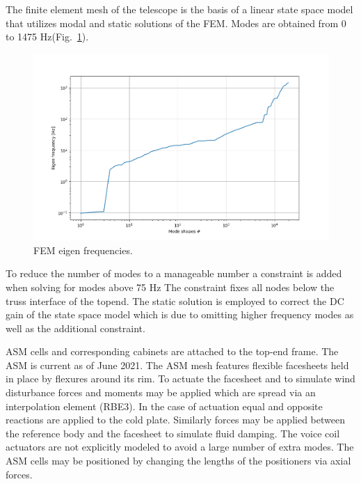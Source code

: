 

The finite element mesh of the telescope is the basis of a linear state space
model that utilizes modal and static solutions of the FEM\cite{20220824_1218_MT_mount_zen_30_m1HFN_ASM_D}. Modes are obtained
from 0 to 1475 Hz(Fig.~\ref{fig:fem-modes}).
\begin{figure}
  \centering
  \includegraphics[width=0.8\linewidth]{FEM/eigen_frequencies.png}
  \caption{FEM eigen frequencies.}
  \label{fig:fem-modes}
\end{figure}
To reduce the number of modes to a manageable number a constraint is added when solving for modes above 75 Hz The constraint fixes all nodes below the truss interface of the topend. 
The static solution is employed to correct the DC gain of the state space model which is due to omitting higher frequency modes as well as the additional constraint.

ASM cells and corresponding cabinets are attached to the top-end frame. 
The ASM is current as of June 2021.
The ASM mesh features flexible facesheets held in place by flexures around its rim. 
To actuate the facesheet and to simulate wind disturbance forces and moments may be applied which are spread via an interpolation element (RBE3). 
In the case of actuation equal and opposite reactions are applied to the cold plate. Similarly forces may be applied between the reference body and the facesheet to simulate fluid damping. The voice coil actuators are not explicitly modeled to avoid a large number of extra modes. 
The ASM cells may be positioned by changing the lengths of the positioners via axial forces.

